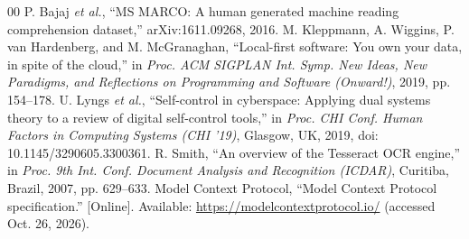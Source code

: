 \documentclass[conference]{IEEEtran}
\begin{document}
\begin{thebibliography}{00}
 P. Bajaj \textit{et al.}, ``MS MARCO: A human generated machine reading comprehension dataset,'' arXiv:1611.09268, 2016.
 M. Kleppmann, A. Wiggins, P. van Hardenberg, and M. McGranaghan, ``Local-first software: You own your data, in spite of the cloud,'' in \textit{Proc. ACM SIGPLAN Int. Symp. New Ideas, New Paradigms, and Reflections on Programming and Software (Onward!)}, 2019, pp. 154--178.
 U. Lyngs \textit{et al.}, ``Self-control in cyberspace: Applying dual systems theory to a review of digital self-control tools,'' in \textit{Proc. CHI Conf. Human Factors in Computing Systems (CHI '19)}, Glasgow, UK, 2019, doi: 10.1145/3290605.3300361.
 R. Smith, ``An overview of the Tesseract OCR engine,'' in \textit{Proc. 9th Int. Conf. Document Analysis and Recognition (ICDAR)}, Curitiba, Brazil, 2007, pp. 629--633.
 Model Context Protocol, ``Model Context Protocol specification.'' [Online]. Available: \url{https://modelcontextprotocol.io/} (accessed Oct. 26, 2026).
\end{thebibliography}
\end{document}
